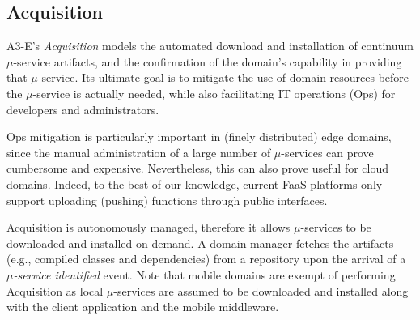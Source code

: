 


\subsection{Acquisition}\label{sec:A3-E-acquisition}

A3-E's \textit{Acquisition} models the automated download and installation of continuum $\mu$-service artifacts, and the confirmation of the domain's capability in providing that $\mu$-service. Its ultimate goal is to mitigate the use of domain resources before the $\mu$-service is actually needed, while also facilitating IT operations (Ops) for developers and administrators. 

Ops mitigation is particularly important in (finely distributed) edge domains, since the manual administration of a large number of $\mu$-services can prove cumbersome and expensive. Nevertheless, this can also prove useful for cloud domains. Indeed, to the best of our knowledge, current FaaS platforms only support uploading (pushing) functions through public interfaces. 

Acquisition is autonomously managed, therefore it allows $\mu$-services to be downloaded 
and installed on demand. A domain manager fetches the artifacts (e.g., compiled classes and dependencies) from a repository upon the arrival of a \textit{$\mu$-service identified} event. Note that mobile domains are exempt of performing Acquisition as local $\mu$-services are assumed to be downloaded and installed along with the client application and the mobile middleware. 

